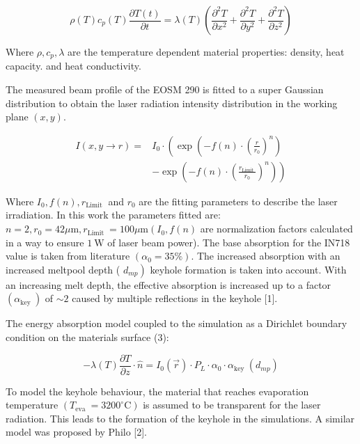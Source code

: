 \documentclass[10pt]{article}
\begin{document}
\begin{equation*}
\rho(T) c_{p}(T) \frac{\partial T(t)}{\partial t}=\lambda(T)\left(\frac{\partial^{2} T}{\partial x^{2}}+\frac{\partial^{2} T}{\partial y^{2}}+\frac{\partial^{2} T}{\partial z^{2}}\right) \tag{1}
\end{equation*}


Where $\rho, c_{p}, \lambda$ are the temperature dependent material properties: density, heat capacity. and heat conductivity.

The measured beam profile of the EOSM 290 is fitted to a super Gaussian distribution to obtain the laser radiation intensity distribution in the working plane $(x, y)$.


\begin{align*}
I(x, y \rightarrow r)= & I_{0} \cdot\left(\exp \left(-f(n) \cdot\left(\frac{r}{r_{0}}\right)^{n}\right)\right. \\
& \left.-\exp \left(-f(n) \cdot\left(\frac{r_{\text {Limit }}}{r_{0}}\right)^{n}\right)\right) \tag{2}
\end{align*}


Where $I_{0}, f(n), r_{\text {Limit }}$ and $r_{0}$ are the fitting parameters to describe the laser irradiation. In this work the parameters fitted are: $n=2, r_{0}=42 \mu \mathrm{m}, r_{\text {Limit }}=100 \mu \mathrm{m}\left(I_{0}, f(n)\right.$ are normalization factors calculated in a way to ensure $1 \mathrm{~W}$ of laser beam power). The base absorption for the IN718 value is taken from literature $\left(\alpha_{0}=35 \%\right)$. The increased absorption with an increased meltpool depth ( $\left.d_{m p}\right)$ keyhole formation is taken into account. With an increasing melt depth, the effective absorption is increased up to a factor $\left(\alpha_{\text {key }}\right)$ of $\sim 2$ caused by multiple reflections in the keyhole [1].

The energy absorption model coupled to the simulation as a Dirichlet boundary condition on the materials surface (3):


\begin{equation*}
-\lambda(T) \frac{\partial T}{\partial z} \cdot \widehat{n}=I_{0}(\vec{r}) \cdot P_{L} \cdot \alpha_{0} \cdot \alpha_{\text {key }}\left(d_{m p}\right) \tag{3}
\end{equation*}


To model the keyhole behaviour, the material that reaches evaporation temperature $\left(T_{\text {eva }}=3200^{\circ} \mathrm{C}\right)$ is assumed to be transparent for the laser radiation. This leads to the formation of the keyhole in the simulations. A similar model was proposed by Philo [2].
\end{document}
